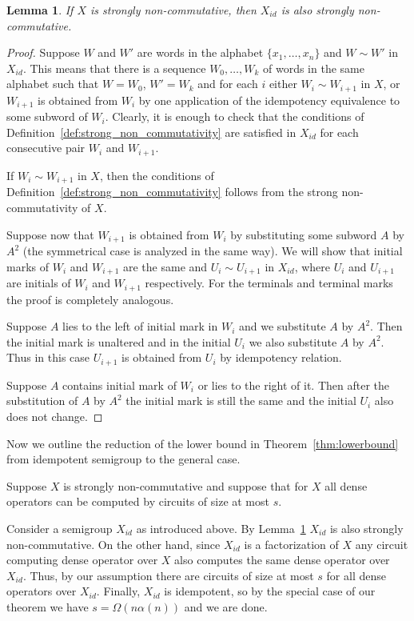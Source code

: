 \documentclass[11pt,letterpaper]{article}
\newtheorem{lemma}{Lemma}
\begin{document}
\begin{lemma} \label{lem:idempotisation}
If $X$ is strongly non-commutative, then $X_{id}$ is also strongly non-commutative.
\end{lemma}

\begin{proof}
Suppose $W$ and $W'$ are words in the alphabet $\{x_1,\ldots, x_n\}$ and $W \sim W'$ in $X_{id}$. This means that there is a sequence $W_0,\ldots, W_k$ of words in the same alphabet such that $W=W_0$, $W'=W_k$ and for each $i$ either $W_i \sim W_{i+1}$ in $X$, or $W_{i+1}$ is obtained from $W_i$ by one application of the idempotency equivalence to some subword of $W_i$. Clearly, it is enough to check that the conditions of Definition~\ref{def:strong_non_commutativity} are satisfied in $X_{id}$ for each consecutive pair $W_i$ and $W_{i+1}$.

If $W_i \sim W_{i+1}$ in $X$, then the conditions of Definition~\ref{def:strong_non_commutativity} follows from the strong non-commutativity of $X$.

Suppose now that $W_{i+1}$ is obtained from $W_{i}$ by substituting some subword $A$ by $A^2$ (the symmetrical case is analyzed in the same way). We will show that initial marks of $W_i$ and $W_{i+1}$ are the same and $U_{i} \sim U_{i+1}$ in $X_{id}$, where $U_{i}$ and $U_{i+1}$ are initials of $W_i$ and $W_{i+1}$ respectively. For the terminals and terminal marks the proof is completely analogous.

Suppose $A$ lies to the left of initial mark in $W_i$ and we substitute $A$ by $A^2$. Then the initial mark is unaltered and in the initial $U_i$ we also substitute $A$ by $A^2$. Thus in this case $U_{i+1}$ is obtained from $U_i$ by idempotency relation.

Suppose $A$ contains initial mark of $W_i$ or lies to the right of it. Then after the substitution of $A$ by $A^2$ the initial mark is still the same and the initial $U_i$ also does not change.
\end{proof}

Now we outline the reduction of the lower bound in Theorem~\ref{thm:lowerbound} from idempotent semigroup to the general case.

Suppose $X$ is strongly non-commutative and suppose that for $X$ all dense operators can be computed by circuits of size at most $s$.

Consider a semigroup $X_{id}$ as introduced above. By Lemma~\ref{lem:idempotisation} $X_{id}$ is also strongly non-commutative. On the other hand, since $X_{id}$ is a factorization of $X$ any circuit computing dense operator over $X$ also computes the same dense operator over $X_{id}$. Thus, by our assumption there are circuits of size at most $s$ for all dense operators over $X_{id}$. Finally, $X_{id}$ is idempotent, so by the special case of our theorem we have $s = \Omega(n \alpha(n))$ and we are done.
\end{document}

